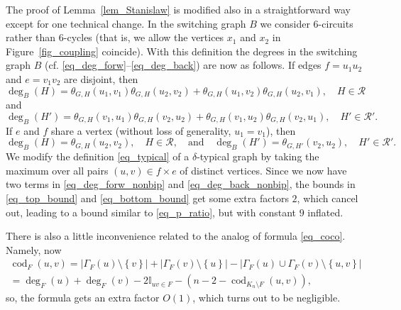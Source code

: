 \documentclass[12pt,reqno]{amsart}
\newcommand{\rc}{{\mathcal{R}}}
\newcommand{\I} {\mathbb I}
\newcommand{\cod}{\operatorname{cod}}
\theoremstyle{definition}
\begin{document}
The proof of Lemma~\ref{lem_Stanislaw} is modified also in a straightforward way except for one technical change. In the switching graph $B$ we consider $6$-circuits rather than $6$-cycles (that is, we allow the vertices $x_1$ and $x_2$ in Figure~\ref{fig_coupling} coincide). With this definition the degrees in the switching graph $B$ (cf.  \eqref{eq_deg_forw}--\eqref{eq_deg_back}) are now as follows. If edges $f = u_1u_2$ and $e = v_1v_2$ are disjoint, then
\begin{equation}
  \label{eq_deg_forw_nonbip}
  \deg_B(H) = \theta_{G,H}(u_1,v_1)\theta_{G,H}(u_2,v_2) + \theta_{G,H}(u_1,v_2)\theta_{G,H}(u_2,v_1), \quad H \in \rc
\end{equation}
and
\begin{equation}
  \label{eq_deg_back_nonbip}
	\deg_B(H') = \theta_{G,H}(v_1,u_1)\theta_{G,H}(v_2,u_2) + \theta_{G,H}(v_1,u_2)\theta_{G,H}(v_2,u_1), \quad H' \in \rc'.
\end{equation}
If $e$ and $f$ share a vertex (without loss of generality, $u_1 = v_1$), then
\begin{equation*}
  \deg_B(H) = \theta_{G,H}(u_2,v_2), \quad H \in \rc, \quad \text{and} \quad
	\deg_B(H') = \theta_{G,H'}(v_2,u_2), \quad H' \in \rc'.
\end{equation*}
We modify the definition \eqref{eq_typical} of a $\delta$-typical graph by taking the maximum over all pairs $(u, v) \in f \times e$ of distinct vertices. Since we now have two terms in \eqref{eq_deg_forw_nonbip} and \eqref{eq_deg_back_nonbip}, the bounds in \eqref{eq_top_bound} and \eqref{eq_bottom_bound} get some extra factors $2$, which cancel out, leading to a bound similar to \eqref{eq_p_ratio}, but with constant $9$ inflated.

\smallskip

There is also a little inconvenience related to the analog of formula \eqref{eq_coco}. Namely,  now
\begin{multline}
  \label{coco_nb}
	  \cod_{F}(u, v) = |\Gamma_{F}(u) \setminus \left\{ v \right\}| + |\Gamma_{F}(v) \setminus \left\{ u \right\}| - |\Gamma_{F}(u) \cup \Gamma_{F}(v) \setminus \left\{ u, v \right\}| \\
	= \deg_F(u)+\deg_F(v) - 2\I_{uv \in F} - (n - 2 - \cod_{K_n \setminus F}(u,v)),
	\end{multline}
	so, the formula gets an extra factor $O(1)$, which turns out to be negligible.
\end{document}
